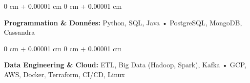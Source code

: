 \documentclass[10pt, letterpaper]{article}
\newenvironment{onecolentry}{
    \begin{adjustwidth}{
        0 cm + 0.00001 cm
    }{
        0 cm + 0.00001 cm
    }
}{
    \end{adjustwidth}
} %
\begin{document}
        
        \begin{onecolentry}
            \textbf{Programmation \& Données:} Python, SQL, Java • PostgreSQL, MongoDB, Cassandra
        \end{onecolentry}

        \vspace{0.2 cm}

        \begin{onecolentry}
            \textbf{Data Engineering \& Cloud:} ETL, Big Data (Hadoop, Spark), Kafka • GCP, AWS, Docker, Terraform, CI/CD, Linux
        \end{onecolentry}


    
\end{document}
